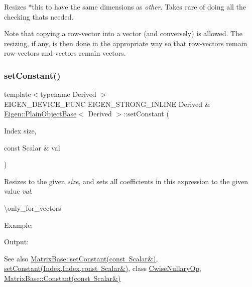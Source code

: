 Resizes {\ttfamily $\ast$this} to have the same dimensions as {\itshape other}. Takes care of doing all the checking that\textquotesingle{}s needed.

Note that copying a row-\/vector into a vector (and conversely) is allowed. The resizing, if any, is then done in the appropriate way so that row-\/vectors remain row-\/vectors and vectors remain vectors. \mbox{\label{class_eigen_1_1_plain_object_base_ac8dea1df3d92b752cc683ff42abf6f9b}} 
\subsubsection{\texorpdfstring{setConstant()}{setConstant()}\hspace{0.1cm}{\footnotesize\ttfamily [1/2]}}
{\footnotesize\ttfamily template$<$typename Derived $>$ \\
E\+I\+G\+E\+N\+\_\+\+D\+E\+V\+I\+C\+E\+\_\+\+F\+U\+NC E\+I\+G\+E\+N\+\_\+\+S\+T\+R\+O\+N\+G\+\_\+\+I\+N\+L\+I\+NE Derived \& \mbox{\hyperlink{class_eigen_1_1_plain_object_base}{Eigen\+::\+Plain\+Object\+Base}}$<$ Derived $>$\+::set\+Constant (\begin{DoxyParamCaption}\item[{Index}]{size,  }\item[{const Scalar \&}]{val }\end{DoxyParamCaption})}

Resizes to the given {\itshape size}, and sets all coefficients in this expression to the given value {\itshape val}.

\textbackslash{}only\+\_\+for\+\_\+vectors

Example\+: 
\begin{DoxyCodeInclude}{0}
\end{DoxyCodeInclude}
 Output\+: 
\begin{DoxyVerbInclude}
\end{DoxyVerbInclude}


\begin{DoxySeeAlso}{See also}
\mbox{\hyperlink{class_eigen_1_1_dense_base_a19b2bc788277e9ab3f967a8857e290ae}{Matrix\+Base\+::set\+Constant(const Scalar\&)}}, \mbox{\hyperlink{class_eigen_1_1_plain_object_base_a56d1fe5d2156174f88341e563bb3c5a9}{set\+Constant(\+Index,\+Index,const Scalar\&)}}, class \mbox{\hyperlink{class_eigen_1_1_cwise_nullary_op}{Cwise\+Nullary\+Op}}, \mbox{\hyperlink{class_eigen_1_1_dense_base_a9053c1a2e9993febe50113b05aac0f20}{Matrix\+Base\+::\+Constant(const Scalar\&)}} 
\end{DoxySeeAlso}
\mbox{\label{class_eigen_1_1_plain_object_base_a56d1fe5d2156174f88341e563bb3c5a9}} 

